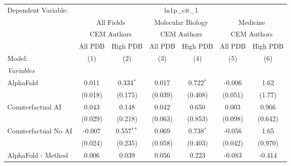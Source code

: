 \begingroup
\centering
\begin{tabular}{lcccccc}
   \tabularnewline \midrule \midrule
   Dependent Variable: & \multicolumn{6}{c}{ln1p\_cit\_1}\\
 & \multicolumn{2}{c}{All Fields} & \multicolumn{2}{c}{Molecular Biology} & \multicolumn{2}{c}{Medicine} \\
\cmidrule(lr){2-3} \cmidrule(lr){4-5} \cmidrule(lr){6-7}
 & \multicolumn{2}{c}{CEM Authors} & \multicolumn{2}{c}{CEM Authors} & \multicolumn{2}{c}{CEM Authors} \\
\cmidrule(lr){2-3} \cmidrule(lr){4-5} \cmidrule(lr){6-7}
 & \multicolumn{1}{c}{All PDB} & \multicolumn{1}{c}{High PDB} & \multicolumn{1}{c}{All PDB} & \multicolumn{1}{c}{High PDB} & \multicolumn{1}{c}{All PDB} & \multicolumn{1}{c}{High PDB} \\
\cmidrule(lr){2-2} \cmidrule(lr){3-3} \cmidrule(lr){4-4} \cmidrule(lr){5-5} \cmidrule(lr){6-6} \cmidrule(lr){7-7}
   Model:                                                     & (1)            & (2)          & (3)            & (4)          & (5)          & (6)\\  
   \midrule
   \emph{Variables}\\
   AlphaFold                                                  & 0.011          & 0.334$^{*}$  & 0.017          & 0.722$^{*}$  & -0.006       & 1.62\\   
                                                              & (0.018)        & (0.175)      & (0.039)        & (0.408)      & (0.051)      & (1.77)\\   
   Counterfactual AI                                          & 0.043          & 0.148        & 0.042          & 0.650        & 0.003        & 0.966\\   
                                                              & (0.029)        & (0.218)      & (0.063)        & (0.853)      & (0.098)      & (0.642)\\   
   Counterfactual No AI                                       & -0.007         & 0.557$^{**}$ & 0.069          & 0.738$^{*}$  & -0.056       & 1.65\\   
                                                              & (0.024)        & (0.235)      & (0.058)        & (0.403)      & (0.042)      & (0.970)\\   
   AlphaFold - Method                                         & 0.006          & 0.039        & 0.056          & 0.223        & -0.083       & -0.414\\   

\end{tabular}
